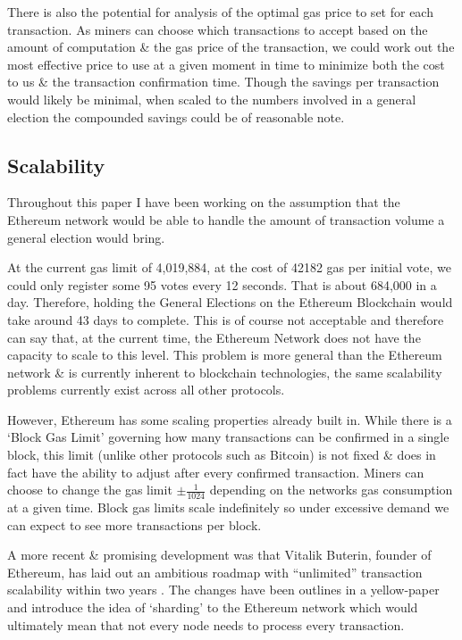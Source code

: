 \documentclass{article}
\begin{document}
	There is also the potential for analysis of the optimal gas price to set for each transaction. As miners can choose which transactions to accept based on the amount of computation \& the gas price of the transaction, we could work out the most effective price to use at a given moment in time to minimize both the cost to us \& the transaction confirmation time. Though the savings per transaction would likely be minimal, when scaled to the numbers involved in a general election the compounded savings could be of reasonable note.
	
		
	\cleardoublepage
	\subsection{Scalability}
	Throughout this paper I have been working on the assumption that the Ethereum network would be able to handle the amount of transaction volume a general election would bring. 
	
	At the current gas limit of 4,019,884, at the cost of 42182 gas per initial vote, we could only register some 95 votes every 12 seconds. That is about 684,000 in a day. Therefore, holding the General Elections on the Ethereum Blockchain would take around 43 days to complete. This is of course not acceptable and therefore can say that, at the current time, the Ethereum Network does not have the capacity to scale to this level. This problem is more general than the Ethereum network \& is currently inherent to blockchain technologies, the same scalability problems currently exist across all other protocols.
	
	However, Ethereum has some scaling properties already built in. While there is a `Block Gas Limit' governing how many transactions can be confirmed in a single block, this limit (unlike other protocols such as Bitcoin) is not fixed \& does in fact have the ability to adjust after every confirmed transaction. Miners can choose to change the gas limit $\pm\frac{1}{1024}$ depending on the networks gas consumption at a given time. Block gas limits scale indefinitely \citep{73_wood_2017} so under excessive demand we can expect to see more transactions per block.
	
	A more recent \& promising development was that Vitalik Buterin, founder of Ethereum, has laid out an ambitious roadmap with ``unlimited'' transaction scalability within two years \citep{74_ethereum_announces_unlimited_scalability_roadmap}. The changes have been outlines in a yellow-paper \citep{73_wood_2017} and introduce the idea of `sharding' to the Ethereum network which would ultimately mean that not every node needs to process every transaction. 
	
\end{document}
